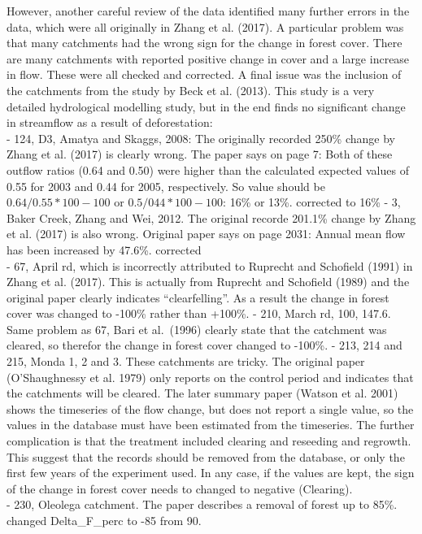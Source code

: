 \documentclass[]{elsarticle} %
\begin{document}
However, another careful review of the data identified many further errors in the data, which were all originally in Zhang et al. (2017). A particular problem was that many catchments had the wrong sign for the change in forest cover. There are many catchments with reported positive change in cover and a large increase in flow. These were all checked and corrected. A final issue was the inclusion of the catchments from the study by Beck et al. (2013). This study is a very detailed hydrological modelling study, but in the end finds no significant change in streamflow as a result of deforestation:\\
- 124, D3, Amatya and Skaggs, 2008: The originally recorded 250\% change by Zhang et al. (2017) is clearly wrong. The paper says on page 7: Both of these outflow ratios (0.64 and 0.50) were higher than the calculated expected values of 0.55 for 2003 and 0.44 for 2005, respectively. So value should be \(0.64/0.55*100 - 100\) or \(0.5/044*100 - 100\): 16\% or 13\%. corrected to 16\%
- 3, Baker Creek, Zhang and Wei, 2012. The original recorde 201.1\% change by Zhang et al. (2017) is also wrong. Original paper says on page 2031: Annual mean flow has been increased by 47.6\%. corrected\\
- 67, April rd, which is incorrectly attributed to Ruprecht and Schofield (1991) in Zhang et al. (2017). This is actually from Ruprecht and Schofield (1989) and the original paper clearly indicates ``clearfelling''. As a result the change in forest cover was changed to -100\% rather than +100\%.
- 210, March rd, 100, 147.6. Same problem as 67, Bari et al.~(1996) clearly state that the catchment was cleared, so therefor the change in forest cover changed to -100\%.
- 213, 214 and 215, Monda 1, 2 and 3. These catchments are tricky. The original paper (O'Shaughnessy et al. 1979) only reports on the control period and indicates that the catchments will be cleared. The later summary paper (Watson et al. 2001) shows the timeseries of the flow change, but does not report a single value, so the values in the database must have been estimated from the timeseries. The further complication is that the treatment included clearing and reseeding and regrowth. This suggest that the records should be removed from the database, or only the first few years of the experiment used. In any case, if the values are kept, the sign of the change in forest cover needs to changed to negative (Clearing).\\
- 230, Oleolega catchment. The paper describes a removal of forest up to 85\%. changed Delta\_F\_perc to -85 from 90.\\
\end{document}

